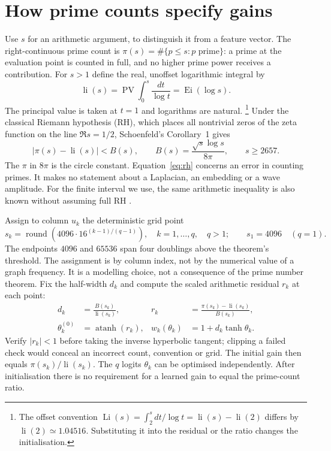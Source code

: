 \documentclass[11pt,a4paper]{article}
\DeclareMathOperator{\li}{li}
\DeclareMathOperator{\Ei}{Ei}
\DeclareMathOperator{\atanh}{atanh}
\begin{document}
\section{How prime counts specify gains}
Use $s$ for an arithmetic argument, to distinguish it from a feature vector.
The right-continuous prime count is $\pi(s)=\#\{p\le s:p\text{ prime}\}$:
a prime at the evaluation point is counted in full, and no higher prime power
receives a contribution. For $s>1$ define the real, unoffset logarithmic
integral by \cite[Eq.~6.2.8]{dlmf}
\begin{equation}
 \li(s)=\operatorname{PV}\!\int_0^s\frac{dt}{\log t}=\Ei(\log s).
\end{equation}
The principal value is taken at $t=1$ and logarithms are natural.%
\footnote{The offset convention $\operatorname{Li}(s)=\int_2^s dt/\log t
=\li(s)-\li(2)$ differs by $\li(2)\simeq1.04516$. Substituting it into
the residual or the ratio changes the initialisation.}
Under the classical Riemann hypothesis (RH), which places all nontrivial
zeros of the zeta function on the line $\Re s=1/2$,
Schoenfeld's Corollary~1 \cite[Eq.~(6.18)]{schoenfeld} gives
\begin{equation}
 |\pi(s)-\li(s)| < B(s),\qquad
 B(s)=\frac{\sqrt{s}\log s}{8\pi},\qquad s\ge2657 .
 \label{eq:rh}
\end{equation}
The $\pi$ in $8\pi$ is the circle constant. Equation~\eqref{eq:rh} concerns
an error in counting primes. It makes no statement about a Laplacian,
an embedding or a wave amplitude. For the finite interval we use, the
same arithmetic inequality is also known without assuming full RH
\cite{johnston}.

Assign to column $u_k$ the deterministic grid point
\begin{equation}
 s_k=\operatorname{round}\!\left(4096\cdot
          16^{(k-1)/(q-1)}\right),\quad k=1,\ldots,q,\quad q>1;
 \qquad s_1=4096\quad(q=1).
\end{equation}
The endpoints $4096$ and $65536$ span four doublings above the theorem's
threshold. The assignment is by column index, not by the numerical value of
a graph frequency. It is a modelling choice, not a consequence of the
prime number theorem. Fix the half-width $d_k$ and compute the scaled
arithmetic residual $r_k$ at each point:
\begin{align}
 d_k&=\frac{B(s_k)}{\li(s_k)}, &
 r_k&=\frac{\pi(s_k)-\li(s_k)}{B(s_k)}, \label{eq:width}\\
 \theta_k^{(0)}&=\atanh(r_k), &
 w_k(\theta_k)&=1+d_k\tanh\theta_k . \label{eq:gain}
\end{align}
Verify $|r_k|<1$ before taking the inverse hyperbolic tangent; clipping a
failed check would conceal an incorrect count, convention or grid. The
initial gain then equals $\pi(s_k)/\li(s_k)$. The $q$ logits $\theta_k$
can be optimised independently. After initialisation there is no requirement
for a learned gain to equal the prime-count ratio.
\end{document}
